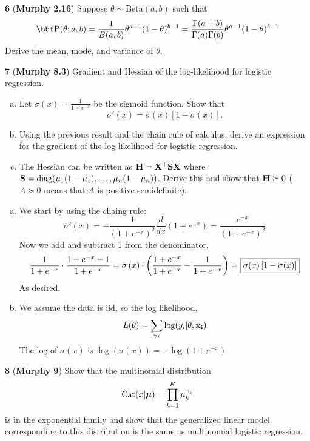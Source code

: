 \documentclass[12pt,letterpaper,fleqn]{hmcpset}
\begin{document}
\newpage



\textbf{6} (\textbf{Murphy 2.16}) Suppose $\theta \sim \text{Beta}(a,b)$ such
that
\[
    \PP(\theta; a,b) = \frac{1}{B(a,b)} \theta^{a-1}(1-\theta)^{b-1} = \frac{\Gamma(a+b)}{\Gamma(a)\Gamma(b)} \theta^{a-1}(1-\theta)^{b-1}
\]
Derive the mean, mode, and variance of $\theta$.

\newpage

\textbf{7} (\textbf{Murphy 8.3}) Gradient and Hessian of the log-likelihood for
logistic regression.
\begin{enumerate}[(a)]
    \item Let $\sigma(x) = \frac{1}{1 + e^{-x}}$ be the sigmoid function. Show that
        \[
            \sigma'(x) = \sigma(x)\left[1 - \sigma(x)\right].
        \]
    \item Using the previous result and the chain rule of calculus, derive an
        expression for the gradient of the log likelihood for logistic regression.
    \item The Hessian can be written as ${\bf H}={\bf X}^\top{\bf S}{\bf X}$ where ${\bf S} =
        {\hbox{diag}}(\mu_1(1-\mu_1), \dots, \mu_n(1-\mu_n))$. Derive this and show that
        ${\bf H} \succeq 0$ ($A \succeq 0$ means that $A$ is positive semidefinite).
\end{enumerate}

\vspace{20mm}


\begin{solution}
	\begin{enumerate}[(a)]
		\item 
			We start by using the chaing rule:
			$$\sigma'(x) = -\frac{1}{(1+e^{-x})^2}\frac{d}{dx}(1+e^{-x}) = \frac{e^{-x}}{(1+e^{-x})^2}$$
			Now we add and subtract 1 from the denominator,
			$$\frac{1}{1 + e^{-x}} \cdot \frac{1 + e^{-x} -1}{1+e^{-x}} = \sigma \left(x\right) \cdot \left(\frac{1 + e^{-x}}{1+e^{-x}} - \frac{1}{1 + e^{-x}} \right) = \fbox{$\sigma(x)\left[1 - \sigma(x)\right]$}$$
			As desired.
		\item
			We assume the data is iid, so the log likelihood, 
			$$L(\theta) = \sum_{\forall i}\log (y_i | \theta, \bf{x}_i)$$
			The log of $\sigma (x)$ is $\log(\sigma(x)) =-\log (1 + e^{-x})$
	\end{enumerate}
\end{solution}

\textbf{8} (\textbf{Murphy 9}) Show that the multinomial distribution
\[
    \text{Cat}(x|\hbox{\boldmath$\mu$}) = \prod_{k=1}^K \mu_k^{x_k}
\]
is in the exponential family and show that the generalized linear model
corresponding to this distribution is the same as multinomial logistic
regression.
\end{document}
